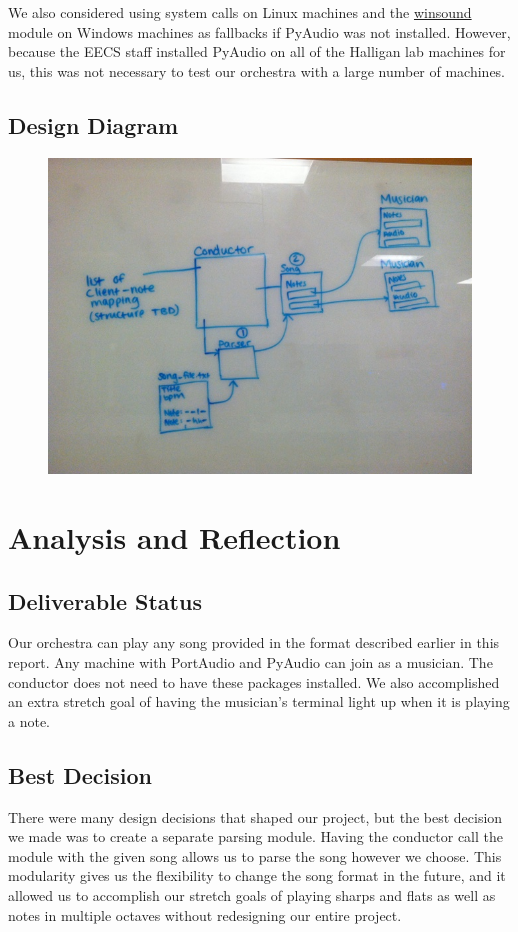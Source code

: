 \documentclass[12pt, letterpaper]{article}
\begin{document}
We also considered using system calls on Linux machines and the
\href{https://docs.python.org/2/library/winsound.html}{winsound} module on Windows machines as
fallbacks if PyAudio was not installed. However, because the EECS staff installed PyAudio on all of
the Halligan lab machines for us, this was not necessary to test our orchestra with a large number
of machines.


\subsection{Design Diagram}
\begin{figure}[ht]
\includegraphics[width=\textwidth]{old_diagram}
\end{figure}


\section{Analysis and Reflection}

\subsection{Deliverable Status}
Our orchestra can play any song provided in the format described earlier in this report. Any machine
with PortAudio and PyAudio can join as a musician. The conductor does not need to have these
packages installed. We also accomplished an extra stretch goal of having the musician's terminal
light up when it is playing a note.

\subsection{Best Decision}
There were many design decisions that shaped our project, but the best decision we made was to
create a separate parsing module. Having the conductor call the module with the given song allows
us to parse the song however we choose. This modularity gives us the flexibility to change the
song format in the future, and it allowed us to accomplish our stretch goals of playing sharps and
flats as well as notes in multiple octaves without redesigning our entire project.
\end{document}
